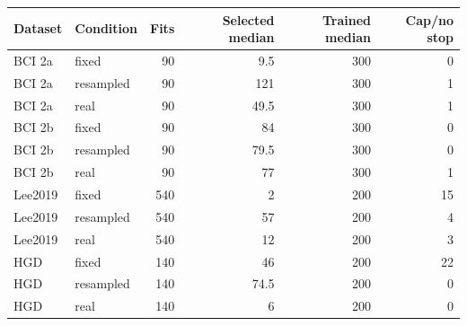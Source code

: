 \begin{tabular}{@{}llrrrr@{}}
\toprule
Dataset & Condition & Fits & Selected median & Trained median & Cap/no stop \\
\midrule
BCI 2a & fixed & 90 & 9.5 & 300 & 0 \\
BCI 2a & resampled & 90 & 121 & 300 & 1 \\
BCI 2a & real & 90 & 49.5 & 300 & 1 \\
BCI 2b & fixed & 90 & 84 & 300 & 0 \\
BCI 2b & resampled & 90 & 79.5 & 300 & 0 \\
BCI 2b & real & 90 & 77 & 300 & 1 \\
Lee2019 & fixed & 540 & 2 & 200 & 15 \\
Lee2019 & resampled & 540 & 57 & 200 & 4 \\
Lee2019 & real & 540 & 12 & 200 & 3 \\
HGD & fixed & 140 & 46 & 200 & 22 \\
HGD & resampled & 140 & 74.5 & 200 & 0 \\
HGD & real & 140 & 6 & 200 & 0 \\
\bottomrule
\end{tabular}
